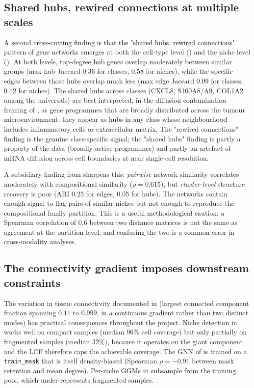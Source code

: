 \subsection*{Shared hubs, rewired connections at multiple scales}

A second cross-cutting finding is that the "shared hubs, rewired connections" pattern of gene networks emerges at both the cell-type level () and the niche level (). At both levels, top-degree hub genes overlap moderately between similar groups (max hub Jaccard $0.36$ for classes, $0.58$ for niches), while the specific edges between those hubs overlap much less (max edge Jaccard $0.09$ for classes, $0.12$ for niches). The shared hubs across classes (CXCL8, S100A8/A9, COL1A2 among the universals) are best interpreted, in the diffusion-contamination framing of , as gene programmes that are broadly distributed across the tumour microenvironment: they appear as hubs in any class whose neighbourhood includes inflammatory cells or extracellular matrix. The "rewired connections" finding is the genuine class-specific signal; the "shared hubs" finding is partly a property of the data (broadly active programmes) and partly an artefact of mRNA diffusion across cell boundaries at near single-cell resolution.

A subsidiary finding from  sharpens this: \emph{pairwise} network similarity correlates moderately with compositional similarity ($\rho = 0.615$), but \emph{cluster-level} structure recovery is poor (ARI $0.25$ for edges, $0.05$ for hubs). The networks contain enough signal to flag pairs of similar niches but not enough to reproduce the compositional family partition. This is a useful methodological caution: a Spearman correlation of $0.6$ between two distance matrices is not the same as agreement at the partition level, and confusing the two is a common error in cross-modality analyses.

\subsection*{The connectivity gradient imposes downstream constraints}

The variation in tissue connectivity documented in  (largest connected component fraction spanning $0.11$ to $0.999$, in a continuous gradient rather than two distinct modes) has practical consequences throughout the project. Niche detection in  works well on compact samples (median $96\%$ cell coverage) but only partially on fragmented samples (median $32\%$), because it operates on the giant component and the LCF therefore caps the achievable coverage. The GNN of  is trained on a \texttt{train\_mask} that is itself density-biased (Spearman $\rho = -0.91$ between mask retention and mean degree). Per-niche GGMs in  subsample from the training pool, which under-represents fragmented samples.

